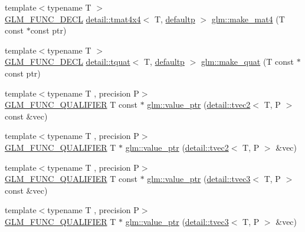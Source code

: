 \begin{DoxyCompactItemize}
\item 
{\footnotesize template$<$typename T $>$ }\\\hyperlink{setup_8hpp_ab2d052de21a70539923e9bcbf6e83a51}{G\+L\+M\+\_\+\+F\+U\+N\+C\+\_\+\+D\+E\+CL} \hyperlink{structglm_1_1detail_1_1tmat4x4}{detail\+::tmat4x4}$<$ T, \hyperlink{namespaceglm_a0f04f086094c747d227af4425893f545a9d21ccd8b5a009ec7eb7677befc3bf51}{defaultp} $>$ \hyperlink{group__gtc__type__ptr_gac3920fd61f0c459a4749b8eb9107982c}{glm\+::make\+\_\+mat4} (T const $\ast$const ptr)
\item 
{\footnotesize template$<$typename T $>$ }\\\hyperlink{setup_8hpp_ab2d052de21a70539923e9bcbf6e83a51}{G\+L\+M\+\_\+\+F\+U\+N\+C\+\_\+\+D\+E\+CL} \hyperlink{structglm_1_1detail_1_1tquat}{detail\+::tquat}$<$ T, \hyperlink{namespaceglm_a0f04f086094c747d227af4425893f545a9d21ccd8b5a009ec7eb7677befc3bf51}{defaultp} $>$ \hyperlink{group__gtc__type__ptr_ga051ec24a44af31a08b11eccbf8726b02}{glm\+::make\+\_\+quat} (T const $\ast$const ptr)
\item 
{\footnotesize template$<$typename T , precision P$>$ }\\\hyperlink{setup_8hpp_a33fdea6f91c5f834105f7415e2a64407}{G\+L\+M\+\_\+\+F\+U\+N\+C\+\_\+\+Q\+U\+A\+L\+I\+F\+I\+ER} T const  $\ast$ \hyperlink{group__gtc__type__ptr_gac57a976f59e794e6406ecf2924a18f4e}{glm\+::value\+\_\+ptr} (\hyperlink{structglm_1_1detail_1_1tvec2}{detail\+::tvec2}$<$ T, P $>$ const \&vec)
\item 
{\footnotesize template$<$typename T , precision P$>$ }\\\hyperlink{setup_8hpp_a33fdea6f91c5f834105f7415e2a64407}{G\+L\+M\+\_\+\+F\+U\+N\+C\+\_\+\+Q\+U\+A\+L\+I\+F\+I\+ER} T $\ast$ \hyperlink{group__gtc__type__ptr_gac2a64387090621acf7176b63f31b70a2}{glm\+::value\+\_\+ptr} (\hyperlink{structglm_1_1detail_1_1tvec2}{detail\+::tvec2}$<$ T, P $>$ \&vec)
\item 
{\footnotesize template$<$typename T , precision P$>$ }\\\hyperlink{setup_8hpp_a33fdea6f91c5f834105f7415e2a64407}{G\+L\+M\+\_\+\+F\+U\+N\+C\+\_\+\+Q\+U\+A\+L\+I\+F\+I\+ER} T const  $\ast$ \hyperlink{group__gtc__type__ptr_ga676a0ba6f4b7cd817fe6d16cb3113857}{glm\+::value\+\_\+ptr} (\hyperlink{structglm_1_1detail_1_1tvec3}{detail\+::tvec3}$<$ T, P $>$ const \&vec)
\item 
{\footnotesize template$<$typename T , precision P$>$ }\\\hyperlink{setup_8hpp_a33fdea6f91c5f834105f7415e2a64407}{G\+L\+M\+\_\+\+F\+U\+N\+C\+\_\+\+Q\+U\+A\+L\+I\+F\+I\+ER} T $\ast$ \hyperlink{group__gtc__type__ptr_ga4babc9956e32bbd0769bc20ab2d73800}{glm\+::value\+\_\+ptr} (\hyperlink{structglm_1_1detail_1_1tvec3}{detail\+::tvec3}$<$ T, P $>$ \&vec)

\end{DoxyCompactItemize}
